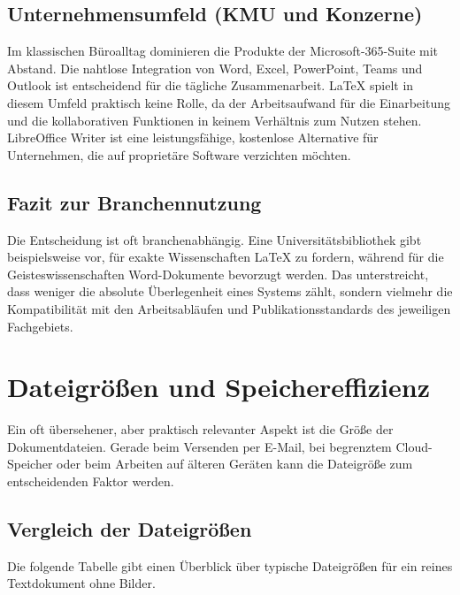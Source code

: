 \documentclass[a4paper,12pt]{article}
\begin{document}
	\subsection{Unternehmensumfeld (KMU und Konzerne)}
	Im klassischen Büroalltag dominieren die Produkte der Microsoft-365-Suite mit Abstand. Die nahtlose Integration von Word, Excel, PowerPoint, Teams und Outlook ist entscheidend für die tägliche Zusammenarbeit. \LaTeX{} spielt in diesem Umfeld praktisch keine Rolle, da der Arbeitsaufwand für die Einarbeitung und die kollaborativen Funktionen in keinem Verhältnis zum Nutzen stehen. LibreOffice Writer ist eine leistungsfähige, kostenlose Alternative für Unternehmen, die auf proprietäre Software verzichten möchten.
	
	\subsection{Fazit zur Branchennutzung}
	Die Entscheidung ist oft branchenabhängig. Eine Universitätsbibliothek gibt beispielsweise vor, für exakte Wissenschaften \LaTeX{} zu fordern, während für die Geisteswissenschaften Word-Dokumente bevorzugt werden. Das unterstreicht, dass weniger die absolute Überlegenheit eines Systems zählt, sondern vielmehr die Kompatibilität mit den Arbeitsabläufen und Publikationsstandards des jeweiligen Fachgebiets.
	
	\section{Dateigrößen und Speichereffizienz}
	\label{sec:dateigroessen}
	
	Ein oft übersehener, aber praktisch relevanter Aspekt ist die Größe der Dokumentdateien. Gerade beim Versenden per E-Mail, bei begrenztem Cloud-Speicher oder beim Arbeiten auf älteren Geräten kann die Dateigröße zum entscheidenden Faktor werden.
	
	\subsection{Vergleich der Dateigrößen}
	
	Die folgende Tabelle gibt einen Überblick über typische Dateigrößen für ein reines Textdokument ohne Bilder.
	
\end{document}
